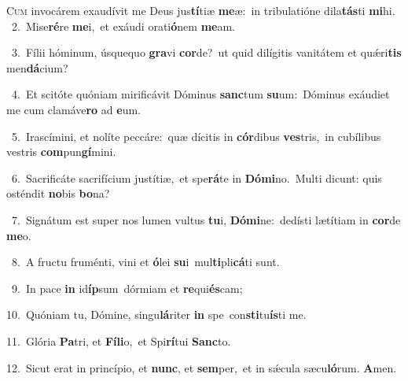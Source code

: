 \lettrine{\initial\textcolor{\initialcolor}{C}}{um} invocárem exaudívit me Deus jus\-\textbf{tí}\-tiæ \textbf{me}\-æ:~\star in tribulatióne dila\-\textbf{tás}\-ti \textbf{mi}\-hi.\\
{\numbfont\textcolor{\numbcolor}{~2.}}~Mise\-\textbf{ré}\-re \textbf{me}\-i,~\star et exáudi orati\-\textbf{ó}\-nem \textbf{me}\-am.\par
{\numbfont\textcolor{\numbcolor}{~3.}}~Fílii hóminum, úsquequo \textbf{gra}\-vi \textbf{cor}\-de?~\star ut quid dilígitis vanitátem et quǽri\textbf{tis} men\-\textbf{dá}\-cium?\par
{\numbfont\textcolor{\numbcolor}{~4.}}~Et scitóte quóniam mirificávit Dóminus \textbf{sanc}\-tum \textbf{su}\-um:~\star Dóminus exáudiet me cum clamáve\textbf{ro} ad \textbf{e}\-um.\par
{\numbfont\textcolor{\numbcolor}{~5.}}~Irascímini, et nolíte peccáre:~\dagger quæ dícitis in \textbf{cór}\-dibus \textbf{ves}\-tris,~\star in cubílibus vestris \textbf{com}\-pun\-\textbf{gí}\-mini.\par
{\numbfont\textcolor{\numbcolor}{~6.}}~Sacrificáte sacrifícium justítiæ,~\dagger et spe\-\textbf{rá}\-te in \textbf{Dó}\-\textbf{mi}no.~\star Multi dicunt: quis osténdit \textbf{no}\-bis \textbf{bo}\-na?\par
{\numbfont\textcolor{\numbcolor}{~7.}}~Signátum est super nos lumen vultus \textbf{tu}\-i, \textbf{Dó}\-\textbf{mi}ne:~\star dedísti lætítiam in \textbf{cor}\-de \textbf{me}\-o.\par
{\numbfont\textcolor{\numbcolor}{~8.}}~A fructu fruménti, vini et \textbf{ó}\-lei \textbf{su}\-i~\star mul\-\textbf{ti}\-pli\-\textbf{cá}\-ti sunt.\par
{\numbfont\textcolor{\numbcolor}{~9.}}~In pace \textbf{in} id\-\textbf{íp}\-sum~\star dórmiam et \textbf{re}\-qui\-\textbf{és}\-cam;\par
{\numbfont\textcolor{\numbcolor}{10.}}~Quóniam tu, Dómine, singu\-\textbf{lá}\-riter \textbf{in} spe~\star con\-\textbf{sti}\-tu\-\textbf{ís}\-ti me.\par
{\numbfont\textcolor{\numbcolor}{11.}}~Glória \textbf{Pa}\-tri, et \textbf{Fí}\-\textbf{li}o,~\star et Spi\-\textbf{rí}\-tui \textbf{Sanc}\-to.\par
{\numbfont\textcolor{\numbcolor}{12.}}~Sicut erat in princípio, et \textbf{nunc}\-, et \textbf{sem}\-per,~\star et in sǽcula sæcu\-\textbf{ló}\-rum. \textbf{A}\-men.\par
